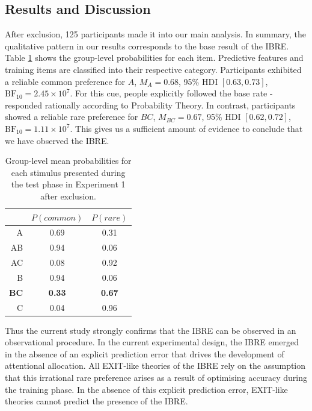 \documentclass[10pt,letterpaper]{article}
\begin{document}
\subsection{Results and Discussion}

After exclusion, 125 participants made it into our main analysis.
In summary, the qualitative pattern in our results corresponds to the base result of the IBRE.
Table \ref*{tab:results-exp1} shows the group-level probabilities for each item.
Predictive features and training items are classified into their respective category.
Participants exhibited a reliable common preference for $A$, $M_{A} = 0.68$, 95\% HDI $[0.63, 0.73]$, $\mathrm{BF}_{10} = 2.45 \times 10^{7}$.
For this cue, people explicitly followed the base rate - responded rationally according to Probability Theory.
In contrast, participants showed a reliable rare preference for $BC$, $M_{BC} = 0.67$, 95\% HDI $[0.62, 0.72]$, $\mathrm{BF}_{10} = 1.11 \times 10^{7}$.
This gives us a sufficient amount of evidence to conclude that we have observed the IBRE.

\begin{table}[ht]
  \begin{center}
    \caption{Group-level mean probabilities for each stimulus presented during the test phase in Experiment 1 after exclusion. \\}
    \label{tab:results-exp1}
    \vskip 0.12in
    \begin{tabular}{rcc}
      \hline
      & $P(common)$ & $P(rare)$ \\
      \hline
      A & 0.69 & 0.31 \\
      AB & 0.94 & 0.06 \\
      AC & 0.08 & 0.92 \\
      B & 0.94 & 0.06 \\
      \textbf{BC} & \textbf{0.33} & \textbf{0.67} \\
      C & 0.04 & 0.96 \\
    \end{tabular}
  \end{center}
\end{table}

Thus the current study strongly confirms that the IBRE can be observed in an observational procedure.
In the current experimental design, the IBRE emerged in the absence of an explicit prediction error that drives the development of attentional allocation.
All EXIT-like theories of the IBRE rely on the assumption that this irrational rare preference arises as a result of optimising accuracy during the training phase.
In the absence of this explicit prediction error, EXIT-like theories cannot predict the presence of the IBRE.
\end{document}
